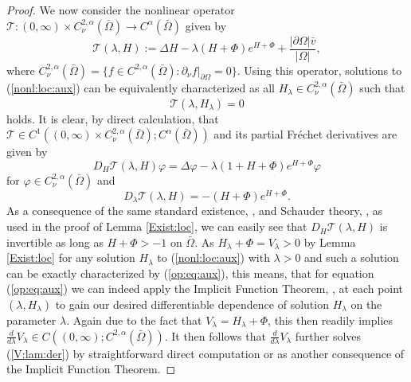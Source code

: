 \documentclass[12pt,a4paper]{amsart}
\theoremstyle{definition}
\theoremstyle{remark}
\numberwithin{equation}{section}
\numberwithin{theorem}{section}
\begin{document}
\begin{proof}
We now consider the nonlinear operator $\mathcal{T}:(0,\infty)\times C^{2,\alpha}_\nu(\bar{\Omega})\rightarrow C^{\alpha}(\bar{\Omega})$ given by
$$
\mathcal{T}(\lambda, H):=\Delta H-\lambda (H+\Phi) e^{H+\Phi}+\frac{|\partial\Omega|\bar{v}}{|\Omega|},
$$
where $C_\nu^{2,\alpha}(\bar{\Omega})=\{f\in C^{2,\alpha}(\bar{\Omega}):\partial_\nu f|_{\partial\Omega}=0\}$. Using this operator, solutions to (\ref{nonl:loc:aux}) can be equivalently characterized as all $H_\lambda \in C_\nu^{2,\alpha}(\bar{\Omega})$ such that
\begin{equation}\label{op:eq:aux}
\mathcal{T}(\lambda, H_\lambda)=0
\end{equation}
holds. It is clear, by direct calculation, that $\mathcal{T}\in C^1((0,\infty)\times C^{2,\alpha}_\nu(\bar{\Omega});C^{\alpha}(\bar{\Omega}))$ and its partial Fr{\'e}chet derivatives are given by 
$$
D_H\mathcal{T}(\lambda, H)\varphi=\Delta\varphi-\lambda(1+H+\Phi)e^{H+\Phi}\varphi
$$
for $\varphi\in C^{2,\alpha}_\nu(\bar{\Omega})$ and
$$
D_\lambda\mathcal{T}(\lambda, H)=-(H+\Phi) e^{H+\Phi}.
$$
As a consequence of the same standard existence, \cite[Theorem 2.4.2.7]{Grisvard}, and Schauder theory, \cite{GNa}, as used in the proof of Lemma \ref{Exist:loc}, we can easily see that $D_H\mathcal{T}(\lambda, H)$ is invertible as long as $H + \Phi > -1$ on $\bar\Omega$. As $H_\lambda + \Phi = V_\lambda > 0$ by Lemma \ref{Exist:loc} for any solution $H_\lambda$ to (\ref{nonl:loc:aux}) with $\lambda>0$ and such a solution can be exactly characterized by (\ref{op:eq:aux}), this means, that for equation (\ref{op:eq:aux}) we can indeed apply the Implicit Function Theorem, \cite[Thm.\ 3.2.1]{AmAr}, at each point $(\lambda,H_\lambda)$ to gain our desired differentiable dependence of solution $H_\lambda$ on the parameter $\lambda$. Again due to the fact that $V_\lambda = H_\lambda + \Phi$, this then readily implies $\frac{d}{d\lambda}V_{\lambda}\in C((0,\infty); C^{2,\alpha}(\bar{\Omega}))$. It then follows that $\frac{d}{d\lambda}V_{\lambda}$ further solves (\ref{V:lam:der}) by straightforward direct computation or as another consequence of the Implicit Function Theorem.
\end{proof}
\end{document}
